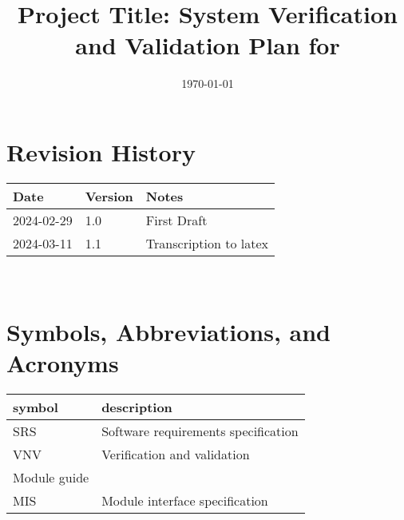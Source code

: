 \documentclass[12pt, titlepage]{article}
\begin{document}
\title{Project Title: System Verification and Validation Plan for \progname{}} 
\author{\authname}
\date{\today}

\maketitle


\section*{Revision History}

\begin{tabularx}{\textwidth}{p{3cm}p{2cm}X}
  \toprule {\bf Date} & {\bf Version} & {\bf Notes}\\
  \midrule
  2024-02-29 & 1.0 & First Draft\\
  2024-03-11 & 1.1 & Transcription to latex\\
  \bottomrule
\end{tabularx}

~\\

\newpage

\tableofcontents

\listoftables
{}

\listoffigures
{}

\newpage

\section{Symbols, Abbreviations, and Acronyms}

\renewcommand{\arraystretch}{1.2}
\begin{tabular}{l l} 
  \toprule		
  \textbf{symbol} & \textbf{description}\\
  \midrule 
  SRS & Software requirements specification\\
  VNV & Verification and validation\\
  Module guide\\
  MIS & Module interface specification\\
  \bottomrule
\end{tabular}\\

\end{document}

